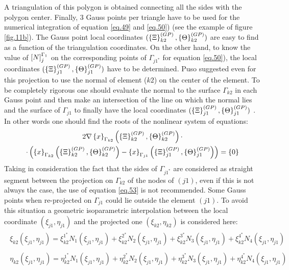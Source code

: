 A triangulation of this polygon is obtained connecting all the sides with the polygon center. Finally, 3 Gauss points per triangle have to be used for the numerical integration of equation \eqref{eq.49} and \eqref{eq.50}) (see the example of figure \ref{fig.11b}). The Gauss point local coordinates  $(\left\lbrace{\Xi}\right \rbrace_{k2}^{(GP)},\left\lbrace{\Theta}\right \rbrace_{k2}^{(GP)})$ are easy to find as a function of the triangulation coordinates. On the other hand, to know the value of $\left[{N}\right]_{j}^{\Gamma_1}$ on the corresponding points of $\Gamma_{j1^*}$ for equation \eqref{eq.50}), the local coordinates  $(\left\lbrace{\Xi}\right \rbrace_{j1}^{(GP)},\left\lbrace{\Theta}\right \rbrace_{j1}^{(GP)})$  have to be determined. Puso suggested even for this projection to use the normal of element ($k2$) on the center of the element. To be completely rigorous one should evaluate the normal to the surface $\Gamma_{k2}$ in each Gauss point and then make an intersection of the line on which the normal lies and the surface of $\Gamma_{j1}$ to finally have the local coordinates $(\left\lbrace{\Xi}\right \rbrace_{j1}^{(GP)},\left\lbrace{\Theta}\right \rbrace_{j1}^{(GP)})$ . In other words one should find the roots of the nonlinear system of equations:
\begin{multline}
\label{eq.53}
2\nabla\left\lbrace{x}\right \rbrace_{\Gamma_{k2}}\left(\left\lbrace{\Xi}\right \rbrace_{k2}^{(GP)},\left\lbrace{\Theta}\right \rbrace_{k2}^{(GP)}\right)\cdot \\ \cdot\left( \left\lbrace{x}\right \rbrace_{\Gamma_{k2}}\left(\left\lbrace{\Xi}\right \rbrace_{k2}^{(GP)},\left\lbrace{\Theta}\right \rbrace_{k2}^{(GP)}\right)-\left\lbrace{x}\right \rbrace_{\Gamma_{j1}}\left(\left\lbrace{\Xi}\right \rbrace_{j1}^{(GP)},\left\lbrace{\Theta}\right \rbrace_{j1}^{(GP)}\right)\right)= \left\lbrace{0}\right \rbrace
\end{multline}
Taking in consideration the fact that the sides of $\Gamma_{j1^*}$ are considered as straight segment between the projection on  $\Gamma_{k2}$ of the nodes of $(j1)$, even if this is not always the case, the use of equation \eqref{eq.53} is not recommended. Some Gauss points when re-projected on $\Gamma_{j1}$ could lie outside the element $(j1)$. To avoid this situation a geometric isoparametric interpolation between the local coordinate $(\xi_{j1},\eta_{j1})$ and the projected one $(\xi_{k2},\eta_{k2})$ is considered here:
\begin{eqnarray}
\label{eq.54}
\begin{aligned}
\xi_{k2}\left(\xi_{j1},\eta_{j1}\right)=\xi_{k2}^{1^*}N_1\left( \xi_{j1},\eta_{j1}\right)+\xi_{k2}^{2^*}N_2\left( \xi_{j1},\eta_{j1}\right)+\xi_{k2}^{3^*}N_3\left( \xi_{j1},\eta_{j1}\right)+\xi_{k2}^{4^*}N_4\left( \xi_{j1},\eta_{j1}\right)
\end{aligned} \\
\label{eq.55}
\begin{aligned}
\eta_{k2}\left(\xi_{j1},\eta_{j1}\right)=\eta_{k2}^{1^*}N_1\left( \xi_{j1},\eta_{j1}\right)+\eta_{k2}^{2^*}N_2\left( \xi_{j1},\eta_{j1}\right)+\eta_{k2}^{3^*}N_3\left( \xi_{j1},\eta_{j1}\right)+\eta_{k2}^{4^*}N_4\left( \xi_{j1},\eta_{j1}\right) 
\end{aligned} 
\end{eqnarray}
